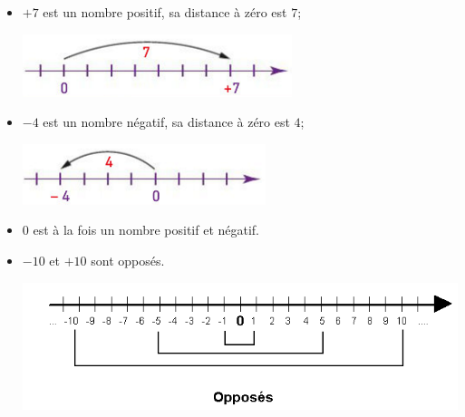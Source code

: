 \documentclass[xcolor={dvipsnames}]{beamer}
\begin{document}
\begin{frame}
	\begin{myexs}
		\begin{itemize}
			\item $+7$ est un nombre \pause positif, sa distance à zéro est \pause $7$; 
			\begin{center}
				\includegraphics[scale=0.6]{ex1}\pause
			\end{center}
			\item $\num{-4}$ est un nombre \pause négatif, sa distance à zéro est \pause $\num{4}$;
			\begin{center}
				\includegraphics[scale=0.6]{ex2}\pause
			\end{center}
			
			\item $0$ est \pause à la fois un nombre positif et négatif.%
			\item $-10$ et $+10$ sont \pause opposés.
			\begin{center}
				\includegraphics[scale=0.5]{opposes}
			\end{center}
		\end{itemize}
	\end{myexs}
\end{frame}
\end{document}
